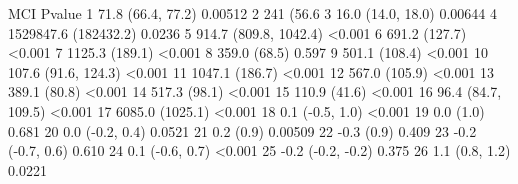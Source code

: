 \documentclass[10pt,a4paper,twoside]{article}
\begin{document}
\begin{Schunk}
\begin{Soutput}
                     MCI  Pvalue
1      71.8 (66.4, 77.2) 0.00512
2            241 (56.6%)  0.0003
3      16.0 (14.0, 18.0) 0.00644
4   1529847.6 (182432.2)  0.0236
5  914.7 (809.8, 1042.4)  <0.001
6          691.2 (127.7)  <0.001
7         1125.3 (189.1)  <0.001
8           359.0 (68.5)   0.597
9          501.1 (108.4)  <0.001
10   107.6 (91.6, 124.3)  <0.001
11        1047.1 (186.7)  <0.001
12         567.0 (105.9)  <0.001
13          389.1 (80.8)  <0.001
14          517.3 (98.1)  <0.001
15          110.9 (41.6)  <0.001
16    96.4 (84.7, 109.5)  <0.001
17       6085.0 (1025.1)  <0.001
18       0.1 (-0.5, 1.0)  <0.001
19             0.0 (1.0)   0.681
20       0.0 (-0.2, 0.4)  0.0521
21             0.2 (0.9) 0.00509
22            -0.3 (0.9)   0.409
23      -0.2 (-0.7, 0.6)   0.610
24       0.1 (-0.6, 0.7)  <0.001
25     -0.2 (-0.2, -0.2)   0.375
26        1.1 (0.8, 1.2)  0.0221
\end{Soutput}
\end{Schunk}
\end{document}
